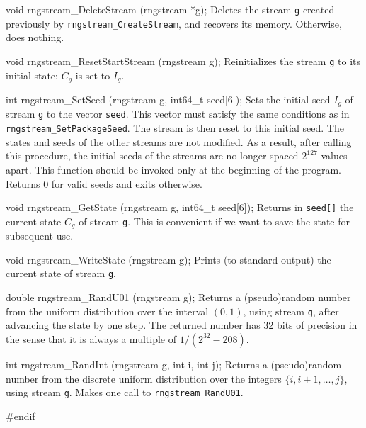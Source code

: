 void rngstream_DeleteStream (rngstream *g);
\endcode
 \tab Deletes the stream {\tt *g} created previously
  by {\tt rngstream\_CreateStream}, and recovers its memory.
  Otherwise, does nothing.
 \endtab
\code

void rngstream_ResetStartStream (rngstream g);
\endcode
 \tab Reinitializes the stream {\tt g} to its initial state:
   $C_g$ is set to $I_g$.
 \endtab
\code

int rngstream_SetSeed (rngstream g, int64_t seed[6]);
\endcode
 \tab  Sets the initial seed $I_g$ of stream {\tt g}
  to the vector {\tt seed}.  This vector must satisfy the same
  conditions as in {\tt rngstream\_SetPackageSeed}.
  The stream is then reset to this initial seed.
  The states and seeds of the other streams are not modified.
  As a result, after calling this procedure, the initial seeds
  of the streams are no longer spaced $2^{127}$ values apart.
  This function should be invoked only at the beginning of the program.
  Returns 0 for valid seeds and exits otherwise.
 \endtab
\code

void rngstream_GetState (rngstream g, int64_t seed[6]);
\endcode
 \tab Returns in {\tt seed[]} the current state $C_g$ of stream {\tt g}.
  This is convenient if we want to save the state for subsequent use.
 \endtab
\code

void rngstream_WriteState (rngstream g);
\endcode
 \tab Prints (to standard output) the current state of stream {\tt g}.
 \endtab
\code

double rngstream_RandU01 (rngstream g);
\endcode
 \tab Returns a (pseudo)random number from the uniform distribution
   over the interval $(0,1)$, using stream {\tt g},
   after advancing the state by one step.
   The returned number has 32 bits of precision in the sense that it is
   always a multiple of $1/(2^{32}-208)$.
 \endtab
\code

int rngstream_RandInt (rngstream g, int i, int j);
\endcode
 \tab Returns a (pseudo)random number from the discrete uniform
   distribution over the integers $\{i,i+1,\dots,j\}$, using stream {\tt g}.
   Makes one call to {\tt rngstream\_RandU01}.
 \endtab
\code\hide

#endif
\endhide
\endcode
